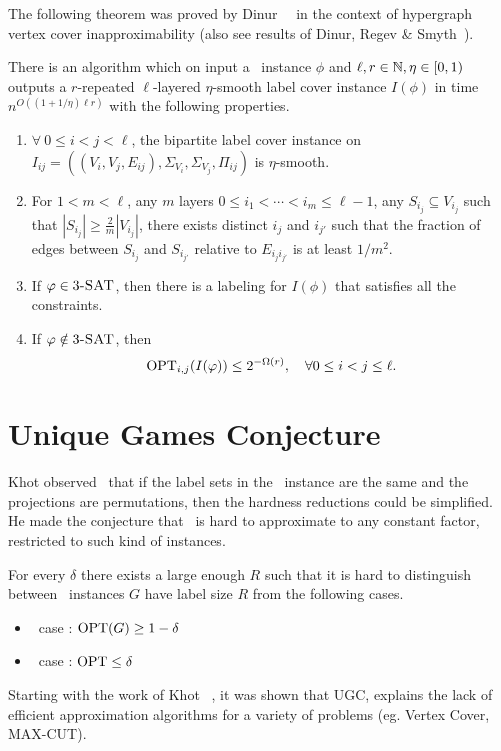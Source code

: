 The following theorem was proved by
Dinur~\etal~\cite{DinurGKR2005} in the context of hypergraph vertex cover
inapproximability (also see results of Dinur, Regev \& Smyth~\cite{DinurRS2005}). 
\begin{theorem}
\label{thm:layered-label-cover} 
There is an algorithm which on input a \TSAT\
instance $\phi$ and $\ell,r\in \mathbb N, \eta \in [0,1)$ outputs a $r$-repeated
$\ell$-layered $\eta$-smooth label cover instance $I(\phi)$ in time
$n^{O((1+1/\eta)\ell r)}$ with the following properties. 
\begin{enumerate} 
\item $\forall~ 0\leq i < j < \ell$, the bipartite label cover instance on
$I_{ij}=\left((V_i,V_j,E_{ij}),\Sigma_{V_i},\Sigma_{V_j},\Pi_{ij}\right)$ is
$\eta$-smooth. 
\item For $1<m<\ell$, any $m$ layers $0\leq i_1< \cdots <i_m\leq
\ell-1$, any $S_{i_j} \subseteq V_{i_j}$ such that $|S_{i_j}| \geq
\frac{2}{m}|V_{i_j}|$, there exists distinct ${i_j}$ and ${i_{j'}}$ such that
the fraction of edges between $S_{i_j}$ and $S_{i_{j'}}$ relative to
$E_{i_ji_{j'}}$ is at least $1/m^2$. 
\item If $\varphi \in \textnormal{$3$\textsc{-SAT}}$, then there is a
labeling for $I(\phi)$ that satisfies all the constraints. 
\item If $\varphi \notin \textnormal{$3$\textsc{-SAT}}$, then 
$$\textnormal{OPT}_{i,j}(I(\varphi)) \leq 2^{-\Omega(r)}, \quad \forall 0\leq i <j \leq \ell.$$ 
\end{enumerate} 
\end{theorem}

\section{Unique Games Conjecture}

Khot observed~\cite{Khot2002} that if the label sets in the \LabelCover\
instance are the same and the projections are permutations, then
the hardness reductions could be simplified.
He made the
conjecture that \LabelCover\ is hard to approximate to any constant factor,
restricted to such kind of instances.
\begin{definition}[Unique Games Conjecture]
For every $\delta$ there exists a large enough $R$ such that it
is hard to distinguish between \UniqueGame\ instances $G$ have label
size  $R$ from the following cases.
\begin{itemize}
\item \YES\ case : $\textnormal{OPT}(G)\geq 1-\delta$
\item \NO\ case :  $\textnormal{OPT} \leq \delta$
\end{itemize}
\end{definition}

Starting with the work of Khot ~\cite{Khot2002}, it was shown that  
UGC, explains the lack of efficient approximation algorithms for a 
variety of problems (eg. Vertex Cover, MAX-CUT).

